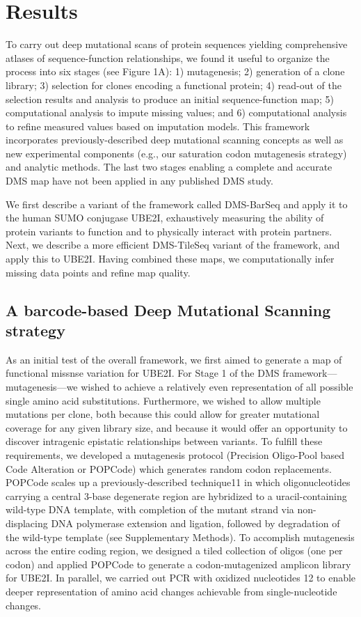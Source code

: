 \section{Results}

To carry out deep mutational scans of protein sequences yielding comprehensive atlases of sequence-function relationships, we found it useful to organize the process into six stages (see Figure 1A): 1) mutagenesis; 2) generation of a clone library; 3) selection for clones encoding a functional protein; 4) read-out of the selection results and analysis to produce an initial sequence-function map; 5) computational analysis to impute missing values; and 6) computational analysis to refine measured values based on imputation models. This framework incorporates previously-described deep mutational scanning concepts as well as new experimental components (e.g., our saturation codon mutagenesis strategy) and analytic methods.  The last two stages enabling a complete and accurate DMS map have not been applied in any published DMS study.

We first describe a variant of the framework called DMS-BarSeq and apply it to the human SUMO conjugase UBE2I, exhaustively measuring the ability of protein variants to function and to physically interact with protein partners.  Next, we describe a more efficient DMS-TileSeq variant of the framework, and apply this to UBE2I.  Having combined these maps, we computationally infer missing data points and refine map quality.

\subsection{A barcode-based Deep Mutational Scanning strategy}

As an initial test of the overall framework, we first aimed to generate a map of functional missnse variation for UBE2I. For Stage 1 of the DMS framework—mutagenesis—we wished to achieve a relatively even representation of all possible single amino acid substitutions.  Furthermore, we wished to allow multiple mutations per clone, both because this could allow for greater mutational coverage for any given library size, and because it would offer an opportunity to discover intragenic epistatic relationships between variants.  To fulfill these requirements, we developed a mutagenesis protocol (Precision Oligo-Pool based Code Alteration or POPCode) which generates random codon replacements. POPCode scales up a previously-described technique11 in which oligonucleotides carrying a central 3-base degenerate region are hybridized to a uracil-containing wild-type DNA template, with completion of the mutant strand via non-displacing DNA polymerase extension and ligation, followed by degradation of the wild-type template (see Supplementary Methods).  To accomplish mutagenesis across the entire coding region, we designed a tiled collection of oligos (one per codon) and applied POPCode to generate a codon-mutagenized amplicon library for UBE2I.  In parallel, we carried out PCR with oxidized nucleotides 12 to enable deeper representation of amino acid changes achievable from single-nucleotide changes.

